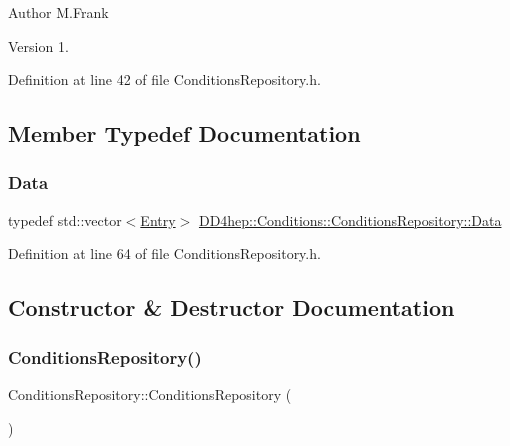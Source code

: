 \begin{DoxyAuthor}{Author}
M.\+Frank 
\end{DoxyAuthor}
\begin{DoxyVersion}{Version}
1. 
\end{DoxyVersion}


Definition at line 42 of file Conditions\+Repository.\+h.



\subsection{Member Typedef Documentation}
\hypertarget{class_d_d4hep_1_1_conditions_1_1_conditions_repository_a2a262d14363e0c6879677397dc595012}{}\label{class_d_d4hep_1_1_conditions_1_1_conditions_repository_a2a262d14363e0c6879677397dc595012} 
\subsubsection{\texorpdfstring{Data}{Data}}
{\footnotesize\ttfamily typedef std\+::vector$<$\hyperlink{class_d_d4hep_1_1_conditions_1_1_conditions_repository_1_1_entry}{Entry}$>$ \hyperlink{class_d_d4hep_1_1_conditions_1_1_conditions_repository_a2a262d14363e0c6879677397dc595012}{D\+D4hep\+::\+Conditions\+::\+Conditions\+Repository\+::\+Data}}



Definition at line 64 of file Conditions\+Repository.\+h.



\subsection{Constructor \& Destructor Documentation}
\hypertarget{class_d_d4hep_1_1_conditions_1_1_conditions_repository_aaf9d3a63aa6f596610104cbc1af2897a}{}\label{class_d_d4hep_1_1_conditions_1_1_conditions_repository_aaf9d3a63aa6f596610104cbc1af2897a} 
\subsubsection{\texorpdfstring{Conditions\+Repository()}{ConditionsRepository()}}
{\footnotesize\ttfamily Conditions\+Repository\+::\+Conditions\+Repository (\begin{DoxyParamCaption}{ }\end{DoxyParamCaption})}



